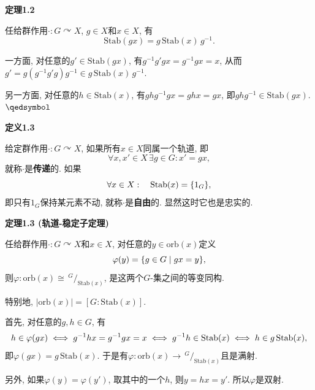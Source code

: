 \documentclass[UTF8]{ctexart}
\begin{document}
\hypertarget{sec:定理1.2}{}
\noindent\textbf{定理1.2}

任给群作用$\cdot:G\curvearrowright X$, $g\in X$和$x\in X$, 有
\[
    \mathrm{Stab}(gx)=g\,\mathrm{Stab}(x)\,g^{-1}.
\]


一方面, 对任意的$g'\in\mathrm{Stab}(gx)$, 有$g^{-1}g'gx=g^{-1}gx=x$,
从而$g'=g(g^{-1}g'g)g^{-1}\in g\,\mathrm{Stab}(x)\,g^{-1}$.

另一方面, 对任意的$h\in\mathrm{Stab}(x)$, 有$ghg^{-1}gx=ghx=gx$,
即$ghg^{-1}\in\mathrm{Stab}(gx)$. \hfill $\qedsymbol$

\vspace{10pt}

\hypertarget{sec:定义1.3}{}
\noindent\textbf{定义1.3}

给定群作用$\cdot:G\curvearrowright X$, 如果所有$x\in X$同属一个轨道, 即
\[
    \forall x,x'\in X\,\exists g\in G:x'=gx,
\]
就称$\cdot$是\textbf{传递}的. 如果
\[
    \forall x\in X:\quad\mathrm{Stab}(x)=\{1_G\},\\[-3pt]
\]
即只有$1_G$保持某元素不动, 就称$\cdot$是\textbf{自由}的.
显然这时它也是忠实的.





\newpage

\hypertarget{sec:定理1.3}{}
\noindent\textbf{定理1.3 (轨道-稳定子定理)}

任给群作用$\cdot:G\curvearrowright X$和$x\in X$,
对任意的$y\in\mathrm{orb}(x)$定义
\[
    \varphi(y)=\{g\in G\mid gx=y\},\\[3pt]
\]
则$\varphi:\mathrm{orb}(x)\cong\,\!^{\displaystyle G}\!
/_{\displaystyle\mathrm{Stab}(x)}$, 是这两个$G$-集之间的等变同构.

\vspace{5pt}
特别地, $|\mathrm{orb}(x)|=[G:\mathrm{Stab}(x)]$.

\vspace{3pt}

首先, 对任意的$g,h\in G$, 有
\[
    h\in\varphi(gx)\iff g^{-1}hx=g^{-1}gx=x\iff
    g^{-1}h\in\mathrm{Stab}(x)\iff h\in g\,\mathrm{Stab}(x),\\[3pt]
\]
即$\varphi(gx)=g\,\mathrm{Stab}(x)$.
于是有$\varphi:\mathrm{orb}(x)\to\,\!^{\displaystyle G}\!
/_{\displaystyle\mathrm{Stab}(x)}$且是满射.

\vspace{3pt}
另外, 如果$\varphi(y)=\varphi(y')$, 取其中的一个$h$,
则$y=hx=y'$. 所以$\varphi$是双射.
\end{document}
